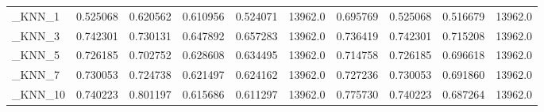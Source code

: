 \begin{tabular}{lrrrrrrrrr}
\_KNN\_1                                             &  0.525068 &         0.620562 &      0.610956 &        0.524071 &        13962.0 &            0.695769 &         0.525068 &           0.516679 &           13962.0 \\
\_KNN\_3                                             &  0.742301 &         0.730131 &      0.647892 &        0.657283 &        13962.0 &            0.736419 &         0.742301 &           0.715208 &           13962.0 \\
\_KNN\_5                                             &  0.726185 &         0.702752 &      0.628608 &        0.634495 &        13962.0 &            0.714758 &         0.726185 &           0.696618 &           13962.0 \\
\_KNN\_7                                             &  0.730053 &         0.724738 &      0.621497 &        0.624162 &        13962.0 &            0.727236 &         0.730053 &           0.691860 &           13962.0 \\
\_KNN\_10                                            &  0.740223 &         0.801197 &      0.615686 &        0.611297 &        13962.0 &            0.775730 &         0.740223 &           0.687264 &           13962.0 \\
\bottomrule
\end{tabular}
